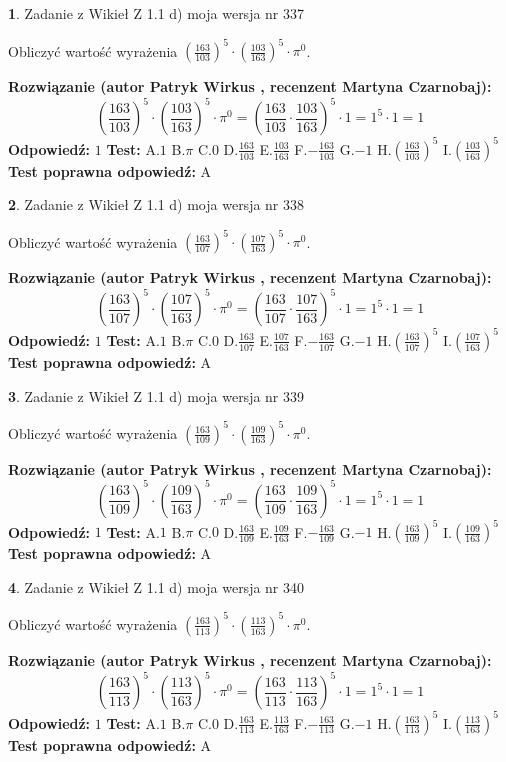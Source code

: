 \documentclass[12pt, a4paper]{article}
\theoremstyle{definition} %
\newtheorem{zad}{}
\newcommand{\zadStart}[1]{\begin{zad}#1\newline}
\newcommand{\zadStop}{\end{zad}}
\newcommand{\rozwStart}[2]{\noindent \textbf{Rozwiązanie (autor #1 , recenzent #2): }\newline}
\newcommand{\rozwStop}{\newline}
\newcommand{\odpStart}{\noindent \textbf{Odpowiedź:}\newline}
\newcommand{\odpStop}{\newline}
\newcommand{\testStart}{\noindent \textbf{Test:}\newline}
\newcommand{\testStop}{\newline}
\newcommand{\kluczStart}{\noindent \textbf{Test poprawna odpowiedź:}\newline}
\newcommand{\kluczStop}{\newline}
\begin{document}
\zadStart{Zadanie z Wikieł Z 1.1 d) moja wersja nr 337}

Obliczyć wartość wyrażenia $(\frac{163}{103})^{5} \cdot (\frac{103}{163})^{5} \cdot \pi^{0}$.
\zadStop
\rozwStart{Patryk Wirkus}{Martyna Czarnobaj}
$$(\frac{163}{103})^{5} \cdot (\frac{103}{163})^{5} \cdot \pi^{0} = (\frac{163}{103} \cdot \frac{103}{163})^{5} \cdot 1 = 1^{5} \cdot 1 = 1$$
\rozwStop
\odpStart
$1$
\odpStop
\testStart
A.$1$ B.$\pi$ C.$0$ D.$\frac{163}{103}$ E.$\frac{103}{163}$
F.$-\frac{163}{103}$ G.$-1$
H.$(\frac{163}{103})^{5}$
I.$(\frac{103}{163})^{5}$
\testStop
\kluczStart
A
\kluczStop



\zadStart{Zadanie z Wikieł Z 1.1 d) moja wersja nr 338}

Obliczyć wartość wyrażenia $(\frac{163}{107})^{5} \cdot (\frac{107}{163})^{5} \cdot \pi^{0}$.
\zadStop
\rozwStart{Patryk Wirkus}{Martyna Czarnobaj}
$$(\frac{163}{107})^{5} \cdot (\frac{107}{163})^{5} \cdot \pi^{0} = (\frac{163}{107} \cdot \frac{107}{163})^{5} \cdot 1 = 1^{5} \cdot 1 = 1$$
\rozwStop
\odpStart
$1$
\odpStop
\testStart
A.$1$ B.$\pi$ C.$0$ D.$\frac{163}{107}$ E.$\frac{107}{163}$
F.$-\frac{163}{107}$ G.$-1$
H.$(\frac{163}{107})^{5}$
I.$(\frac{107}{163})^{5}$
\testStop
\kluczStart
A
\kluczStop



\zadStart{Zadanie z Wikieł Z 1.1 d) moja wersja nr 339}

Obliczyć wartość wyrażenia $(\frac{163}{109})^{5} \cdot (\frac{109}{163})^{5} \cdot \pi^{0}$.
\zadStop
\rozwStart{Patryk Wirkus}{Martyna Czarnobaj}
$$(\frac{163}{109})^{5} \cdot (\frac{109}{163})^{5} \cdot \pi^{0} = (\frac{163}{109} \cdot \frac{109}{163})^{5} \cdot 1 = 1^{5} \cdot 1 = 1$$
\rozwStop
\odpStart
$1$
\odpStop
\testStart
A.$1$ B.$\pi$ C.$0$ D.$\frac{163}{109}$ E.$\frac{109}{163}$
F.$-\frac{163}{109}$ G.$-1$
H.$(\frac{163}{109})^{5}$
I.$(\frac{109}{163})^{5}$
\testStop
\kluczStart
A
\kluczStop



\zadStart{Zadanie z Wikieł Z 1.1 d) moja wersja nr 340}

Obliczyć wartość wyrażenia $(\frac{163}{113})^{5} \cdot (\frac{113}{163})^{5} \cdot \pi^{0}$.
\zadStop
\rozwStart{Patryk Wirkus}{Martyna Czarnobaj}
$$(\frac{163}{113})^{5} \cdot (\frac{113}{163})^{5} \cdot \pi^{0} = (\frac{163}{113} \cdot \frac{113}{163})^{5} \cdot 1 = 1^{5} \cdot 1 = 1$$
\rozwStop
\odpStart
$1$
\odpStop
\testStart
A.$1$ B.$\pi$ C.$0$ D.$\frac{163}{113}$ E.$\frac{113}{163}$
F.$-\frac{163}{113}$ G.$-1$
H.$(\frac{163}{113})^{5}$
I.$(\frac{113}{163})^{5}$
\testStop
\kluczStart
A
\kluczStop
\end{document}

